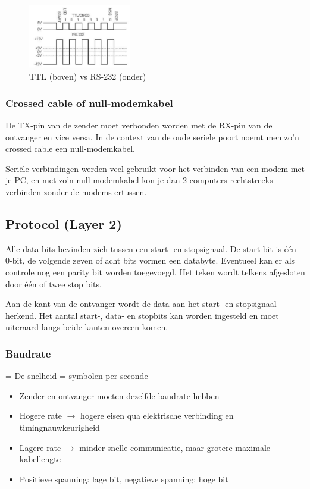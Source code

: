 \documentclass{article}
\begin{document}
\begin{figure}[H]
    \centering
    \includegraphics[width=0.4\textwidth]{ttl-vs-rs232.png}
    \caption{TTL (boven) vs RS-232 (onder)}
\end{figure}

\subsubsection{Crossed cable of null-modemkabel}
De TX-pin van de zender moet verbonden worden met de RX-pin van de ontvanger en vice versa. 
In de context van de oude seriele poort noemt men zo'n crossed cable een null-modemkabel.

Seriële verbindingen werden veel gebruikt voor het verbinden van een modem met je PC, en met zo’n null-modemkabel kon je dan 2 computers rechtstreeks
verbinden zonder de modems ertussen.

\subsection{Protocol (Layer 2)}
Alle data bits bevinden zich tussen een start- en stopsignaal. De start bit is één 0-bit, de volgende
zeven of acht bits vormen een databyte. Eventueel kan er als controle nog een parity bit worden
toegevoegd. Het teken wordt telkens afgesloten door één of twee stop bits.

Aan de kant van de ontvanger wordt de data aan het start- en stopsignaal herkend.
Het aantal start-, data- en stopbits kan worden ingesteld en moet uiteraard langs beide kanten overeen komen.

\subsubsection{Baudrate}
= De snelheid = symbolen per seconde

\begin{itemize}
    \item Zender en ontvanger moeten dezelfde baudrate hebben
    \item Hogere rate $\rightarrow$ hogere eisen qua elektrische verbinding en timingnauwkeurigheid
    \item Lagere rate $\rightarrow$ minder snelle communicatie, maar grotere maximale kabellengte
    \item Positieve spanning: lage bit, negatieve spanning: hoge bit
\end{itemize}
\end{document}
